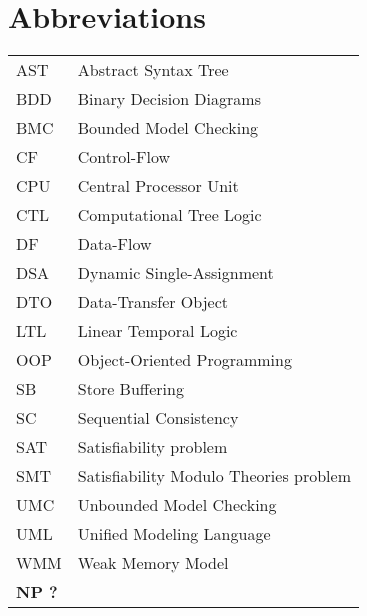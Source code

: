 \chapter*{Abbreviations}


\noindent
\begin{longtable}{@{}p{}p{}@{}}
AST & Abstract Syntax Tree \\
BDD & Binary Decision Diagrams \\
BMC & Bounded Model Checking \\
CF  & Control-Flow \\
CPU & Central Processor Unit \\
CTL & Computational Tree Logic \\
DF  & Data-Flow \\
DSA & Dynamic Single-Assignment \\
DTO & Data-Transfer Object \\
LTL & Linear Temporal Logic \\
OOP & Object-Oriented Programming \\
SB  & Store Buffering \\
SC  & Sequential Consistency \\
SAT & Satisfiability problem \\
SMT & Satisfiability Modulo Theories problem \\
UMC & Unbounded Model Checking \\
UML & Unified Modeling Language \\ %
WMM & Weak Memory Model \\
\textbf{NP ?} & \\
\end{longtable}

